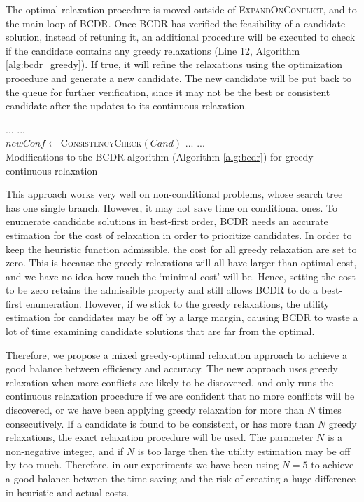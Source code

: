 \documentclass[jair,twoside,11pt,theapa]{article}
\let\oldnl\nl%
\newcommand{\nonl}{\renewcommand{\nl}{\let\nl\oldnl}}%
\begin{document}
The optimal relaxation procedure is moved outside of \textsc{ExpandOnConflict}, and to the main loop of BCDR. Once BCDR has verified
the feasibility of a candidate solution, instead of retuning it, an additional
procedure will be executed to check if the candidate contains any greedy
relaxations (Line 12, Algorithm \ref{alg:bcdr_greedy}). If true, it will refine
the relaxations using the optimization procedure and generate a new candidate.
The new candidate will be put back to the queue for further verification, since
it may not be the best or consistent candidate after the updates to its
continuous relaxation.



\begin{algorithm}[htb!]
\setcounter{AlgoLine}{9}
\nonl ... ...\\
$\mathit{newConf}\leftarrow$\textsc{ConsistencyCheck}$(\mathit{Cand})$\;
\nonl ... ... \\
\caption{Modifications to the BCDR algorithm (Algorithm \ref{alg:bcdr}) for greedy continuous relaxation}
\label{alg:bcdr_greedy}
\end{algorithm}



This approach works very well on non-conditional problems, whose search tree has
one single branch. However, it may not save time on conditional ones. To enumerate candidate solutions in best-first order, BCDR needs an
accurate estimation for the cost of relaxation in order to prioritize
candidates. In order to keep the heuristic function admissible, the cost for all
greedy relaxation are set to zero. This is because the greedy relaxations will
all have larger than optimal cost, and we have no idea how much the `minimal cost'
will be. Hence, setting the cost to be zero retains the admissible property and
still allows BCDR to do a best-first enumeration. However, if we stick to the
greedy relaxations, the utility estimation for candidates may be off by a large
margin, causing BCDR to waste a lot of time examining candidate solutions that
are far from the optimal.


Therefore, we propose a mixed greedy-optimal relaxation approach to achieve a
good balance between efficiency and accuracy. The new approach uses greedy
relaxation when more conflicts are likely to be discovered, and only runs the
continuous relaxation procedure if we are confident that no more conflicts will be
discovered, or we have been applying greedy relaxation for more than $N$ times
consecutively. If a candidate is found to be consistent, or has more than $N$
greedy relaxations, the exact relaxation procedure will be used. The parameter
$N$ is a non-negative integer, and if $N$ is too large then the utility
estimation may be off by too much. Therefore, in our experiments we have been
using $N=5$ to achieve a good balance between the time saving and the risk of
creating a huge difference in heuristic and actual costs.
\end{document}
